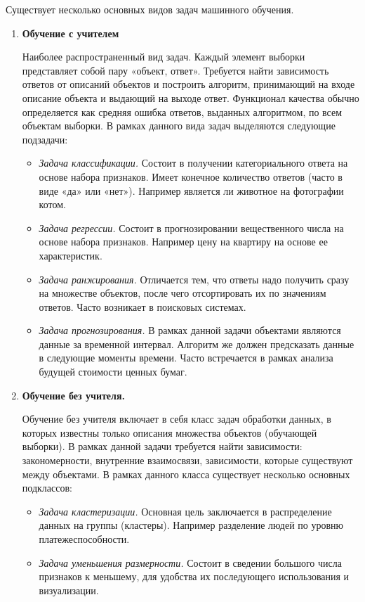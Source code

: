 Существует несколько основных видов задач машинного обучения.
\begin{enumerate}
	\item \textbf{Обучение с учителем} 
	
	Наиболее распространенный вид задач. Каждый элемент выборки представляет собой пару «объект, ответ». Требуется найти зависимость ответов от описаний объектов и построить алгоритм, принимающий на входе описание объекта и выдающий на выходе ответ. Функционал качества обычно определяется как средняя ошибка ответов, выданных алгоритмом, по всем объектам выборки. В рамках данного вида задач выделяются следующие подзадачи:
	\begin{itemize}
		\item  {\it Задача классификации.} Состоит в получении категориального ответа на основе набора признаков. Имеет конечное количество ответов (часто в виде «да» или «нет»). Например является ли животное на фотографии котом.
		\item  {\it Задача регрессии.} Состоит в прогнозировании вещественного числа на основе набора признаков. Например цену на квартиру на основе ее характеристик. 
		\item  {\it Задача ранжирования.} Отличается тем, что ответы надо получить сразу на множестве объектов, после чего отсортировать их по значениям ответов. Часто возникает в поисковых системах. 
		\item  {\it Задача прогнозирования.}  В рамках данной задачи объектами являются данные за временной интервал. Алгоритм же должен предсказать данные в следующие моменты времени. Часто встречается в рамках анализа будущей стоимости ценных бумаг.
	\end{itemize}
	
	\item \textbf{Обучение без учителя.}
	
	Обучение без учителя включает в себя класс задач обработки данных, в которых известны только описания множества объектов (обучающей выборки). В рамках данной задачи требуется найти зависимости: закономерности, внутренние взаимосвязи, зависимости, которые существуют между объектами. В рамках данного класса существует несколько основных подклассов:
	\begin{itemize}
		\item  {\it Задача кластеризации.} Основная цель заключается в  распределение данных на группы (кластеры). Например разделение людей по уровню платежеспособности.
		\item  {\it Задача уменьшения размерности.} Состоит в сведении большого числа признаков к меньшему, для удобства их последующего использования и визуализации.
	\end{itemize}
	

\end{enumerate}
